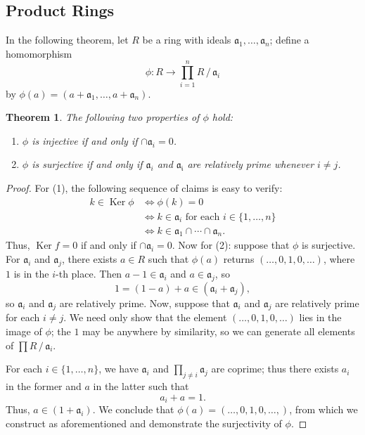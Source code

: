 \documentclass[11pt]{article}
\newtheorem{theorem}{Theorem}
\newcommand{\Ker}{\operatorname{Ker}}
\begin{document}

\subsection*{Product Rings}

In the following theorem, let $R$ be a ring with ideals $\mathfrak{a}_{1}, \ldots, \mathfrak{a}_{n}$; define a homomorphism
\[
	\phi : R \to \prod_{i = 1}^{n} R \,/\, \mathfrak{a}_{i}
\]
by $\phi(a) = (a + \mathfrak{a}_{1}, \ldots, a + \mathfrak{a}_{n})$.

\begin{adjustwidth}{0.5cm}{}
	\begin{theorem}
		The following two properties of $\phi$ hold:
		\begin{enumerate}
			\item $\phi$ is injective if and only if $\cap \mathfrak{a}_{i} = 0$.
			\item $\phi$ is surjective if and only if $\mathfrak{a}_{i}$ and $\mathfrak{a_{i}}$ are relatively prime whenever $i \ne j$.
		\end{enumerate}
	\end{theorem}
	\begin{proof}
		For (1), the following sequence of claims is easy to verify:
		\begin{align*}
			k \in \Ker \phi &\iff \phi(k) = 0 \\
			&\iff k \in \mathfrak{a}_{i} \text{ for each } i \in \{ 1, \ldots, n \} \\
			&\iff k \in \mathfrak{a}_{1} \cap \cdots \cap \mathfrak{a}_{n}.
		\end{align*}
		 Thus, $\Ker f = 0$ if and only if $\cap \mathfrak{a}_{i} = 0$. Now for (2): suppose that $\phi$ is surjective. For $\mathfrak{a}_{i}$ and $\mathfrak{a}_{j}$, there exists $a \in R$ such that $\phi(a)$ returns $(\ldots, 0, 1, 0, \ldots)$, where $1$ is in the $i$-th place. Then $a - 1 \in \mathfrak{a}_{i}$ and $a \in \mathfrak{a}_{j}$, so
		 \[
		 	1  = (1 - a) + a \in (\mathfrak{a}_{i} + \mathfrak{a}_{j}),
		 \]
		so $\mathfrak{a}_{i}$ and $\mathfrak{a}_{j}$ are relatively prime. Now, suppose that $\mathfrak{a}_{i}$ and $\mathfrak{a}_{j}$ are relatively prime for each $i \ne j$. We need only show that the element $(\ldots, 0, 1, 0, \ldots)$ lies in the image of $\phi$; the $1$ may be anywhere by similarity, so we can generate all elements of $\prod R \,/\, \mathfrak{a}_{i}$.

		For each $i \in \{ 1, \ldots, n \}$, we have $\mathfrak{a}_{i}$ and $\prod_{j \ne i} \mathfrak{a}_{j}$ are coprime; thus there exists $a_{i}$ in the former and $a$ in the latter such that
		\[
			a_{i} + a = 1.
		\]
		Thus, $a \in (1 + \mathfrak{a}_{i})$. We conclude that $\phi(a) = (\ldots, 0, 1, 0, \ldots,)$, from which we construct as aforementioned and demonstrate the surjectivity of $\phi$.
	\end{proof}
\end{adjustwidth}
\end{document}
